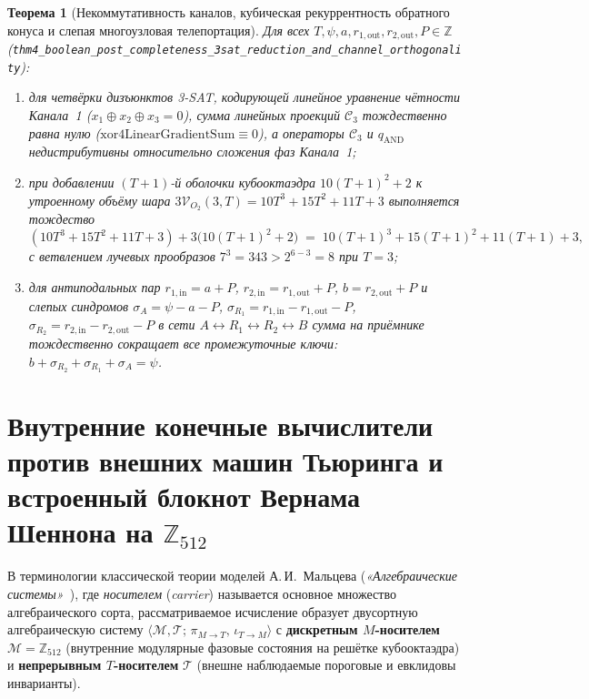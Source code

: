 \documentclass[11pt,a4paper]{article}
\theoremstyle{plain}
\newtheorem{theorem}{Теорема}[section]
\theoremstyle{definition}
\begin{document}
\begin{theorem}[Некоммутативность каналов, кубическая рекуррентность обратного конуса и слепая многоузловая телепортация]
\label{thm:main-4b}
Для всех $T,\psi,a,r_{1,\mathrm{out}},r_{2,\mathrm{out}},P\in\mathbb{Z}$ (\texttt{thm4\_boolean\_post\_completeness\_3sat\_reduction\_and\_channel\_orthogonality}):
\begin{enumerate}[label=\textbf{(\roman*)},leftmargin=*,noitemsep]
\item для четвёрки дизъюнктов 3-SAT, кодирующей линейное уравнение чётности Канала~1 ($x_1\oplus x_2\oplus x_3=0$), сумма линейных проекций $\mathcal{C}_3$ тождественно равна нулю ($\mathrm{xor4LinearGradientSum}\equiv 0$), а операторы $\mathcal{C}_3$ и $q_{\mathrm{AND}}$ недистрибутивны относительно сложения фаз Канала~1;
\item при добавлении $(T+1)$-й оболочки кубооктаэдра $10(T+1)^2+2$ к утроенному объёму шара $3\mathcal{V}_{O_2}(3,T) = 10T^3+15T^2+11T+3$ выполняется тождество
  \[
    (10T^3+15T^2+11T+3) + 3\bigl(10(T+1)^2+2\bigr) \;=\; 10(T+1)^3 + 15(T+1)^2 + 11(T+1) + 3,
  \]
  с ветвлением лучевых прообразов $7^3 = 343 > 2^{6-3} = 8$ при $T=3$;
\item для антиподальных пар $r_{1,\mathrm{in}} = a+P$, $r_{2,\mathrm{in}} = r_{1,\mathrm{out}}+P$, $b = r_{2,\mathrm{out}}+P$ и слепых синдромов $\sigma_A = \psi-a-P$, $\sigma_{R_1} = r_{1,\mathrm{in}}-r_{1,\mathrm{out}}-P$, $\sigma_{R_2} = r_{2,\mathrm{in}}-r_{2,\mathrm{out}}-P$ в сети $A\leftrightarrow R_1\leftrightarrow R_2\leftrightarrow B$ сумма на приёмнике тождественно сокращает все промежуточные ключи: $b + \sigma_{R_2} + \sigma_{R_1} + \sigma_A = \psi$.
\end{enumerate}
\end{theorem}

\section{Внутренние конечные вычислители против внешних машин Тьюринга и встроенный блокнот Вернама Шеннона на \texorpdfstring{$\mathbb{Z}_{512}$}{Z512}}
\label{sec:embedded-adversary-vernam}

В терминологии классической теории моделей А.\,И.~Мальцева (\emph{«Алгебраические системы»}~\cite{Malcev1970}), где \emph{носителем} (\emph{carrier}) называется основное множество алгебраического сорта, рассматриваемое исчисление образует двусортную алгебраическую систему $\langle\mathcal{M},\mathcal{T};\,\pi_{M\to T},\,\iota_{T\to M}\rangle$ с \textbf{дискретным $M$-носителем} $\mathcal{M}=\mathbb{Z}_{512}$ (внутренние модулярные фазовые состояния на решётке кубооктаэдра) и \textbf{непрерывным $T$-носителем} $\mathcal{T}$ (внешне наблюдаемые пороговые и евклидовы инварианты).
\end{document}

